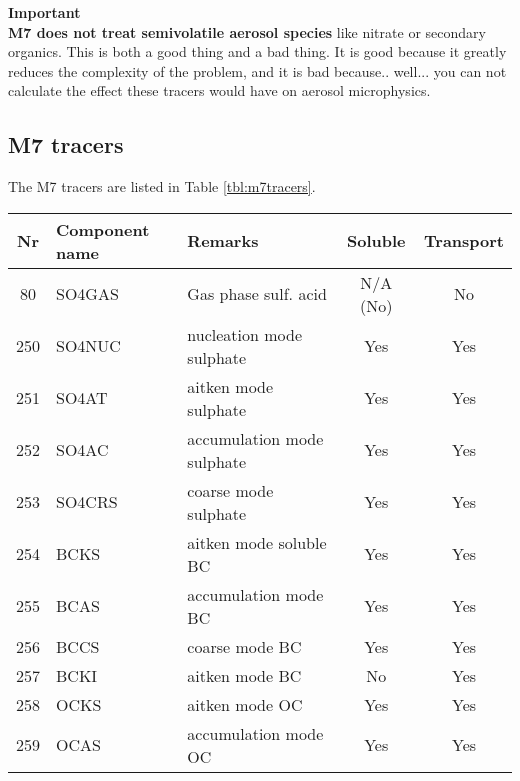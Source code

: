 {\bf Important}\\
{\bf M7 does not treat semivolatile aerosol species} like nitrate or
secondary organics. This is both a good thing and a bad thing. It is
good because it greatly  reduces the complexity of the problem, and it
is bad because.. well... you can not calculate the effect these
tracers would have on aerosol microphysics.

\subsection{M7 tracers}
The M7 tracers are listed in Table \ref{tbl:m7tracers}.

\begin{table*}
\caption{Tracers included in the M7 model. All the aerosol species
  (250--274) have lifetimes of days-weeks and they all need to be
  transported. Water species (275--278) are in equilibrium (see below)
  and should not be transported. Soluble species (except water) are
  washed out in convection. There are 17 soluble species in M7.}
\label{tbl:m7tracers}
\begin{minipage}{\linewidth}
\begin{tabular}{|c|l|l|c|c|}
\hline
Nr  & Component name & Remarks                 & Soluble   &  Transport \\
\hline \hline
80  & SO4GAS     &  Gas phase sulf. acid       &  N/A (No) & No\\
\hline
250 & SO4NUC     &    nucleation mode sulphate &  Yes      &  Yes\\
\hline
251 & SO4AT      &    aitken mode sulphate     &  Yes      &  Yes\\
\hline
252 & SO4AC      &    accumulation mode sulphate &  Yes    &  Yes\\
\hline
253 & SO4CRS     &    coarse mode sulphate  &  Yes       &  Yes\\
\hline
254 & BCKS       &  aitken mode soluble BC  &  Yes       &  Yes\\
\hline
255 & BCAS       &    accumulation mode BC  &  Yes       &  Yes\\
\hline
256 & BCCS       &    coarse mode BC        &  Yes       &  Yes\\
\hline
257 & BCKI       &    aitken mode BC        &  No        &  Yes\\
\hline
258 & OCKS       &    aitken mode OC        &  Yes       &  Yes\\
\hline
259 & OCAS       &    accumulation mode OC  &  Yes       &  Yes\\

\end{tabular}
\end{minipage}
\end{table*}
